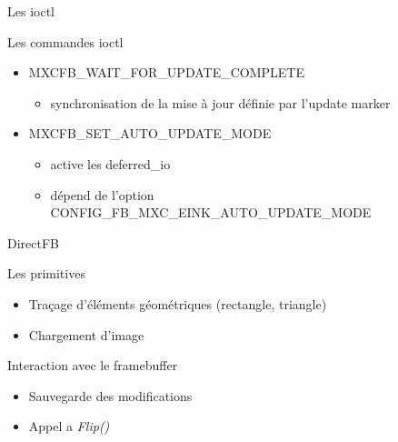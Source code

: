 \begin{frame}{Les ioctl}
	\begin{block} {Les commandes ioctl}
		\begin{itemize}
				\item MXCFB\_WAIT\_FOR\_UPDATE\_COMPLETE
			\begin{itemize}
				\item synchronisation de la mise à jour définie par l'update marker
			\end{itemize}
			\item MXCFB\_SET\_AUTO\_UPDATE\_MODE
			\begin{itemize}
				\item active les deferred\_io
				\item dépend de l'option CONFIG\_FB\_MXC\_EINK\_AUTO\_UPDATE\_MODE
			\end{itemize}
		\end{itemize}
	\end{block}
\end{frame}


\begin{frame}{DirectFB}
	\begin{block} { Les primitives }
		\begin{itemize}
			\item Traçage d'éléments géométriques (rectangle, triangle)
			\item Chargement d'image
		\end{itemize}
	\end{block}
	\begin{block} { Interaction avec le framebuffer }
		 \begin{itemize}
		 	\item Sauvegarde des modifications%
		 	\item Appel a \emph{Flip()} 
		 \end{itemize}
	\end{block}
\end{frame}
